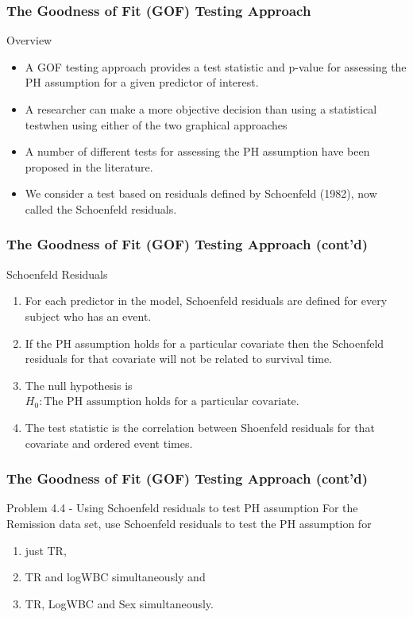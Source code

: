 \documentclass{beamer}
\theoremstyle{definition}
\begin{document}
\begin{frame}
\frametitle{The Goodness of Fit (GOF) Testing Approach}
\begin{block}{Overview}
\begin{itemize}
\item A GOF testing approach provides a test statistic and p-value for
assessing the PH assumption for a given predictor of interest.
\item A researcher can make a more objective decision than using a statistical testwhen using either of
the two graphical approaches
\item A number of different tests for assessing the PH
assumption have been proposed in the literature.
\item We consider a test  based on residuals
defined by Schoenfeld (1982), now called the Schoenfeld
residuals.
\end{itemize}
\end{block}
\end{frame}

\begin{frame}
\frametitle{The Goodness of Fit (GOF) Testing Approach (cont'd)}
\begin{block}{Schoenfeld Residuals}
\begin{enumerate}
\item For each predictor in the model, Schoenfeld
residuals are defined for every subject who
has an event.
\item If the PH assumption holds for a particular covariate
then the Schoenfeld residuals for that
covariate will not be related to survival time.
\item The null hypothesis is $H_0: \text{The PH assumption holds for a particular covariate}$.
\item The test statistic is the correlation between Shoenfeld residuals for that covariate and ordered event times.
\end{enumerate}
\end{block}
\end{frame}

\begin{frame}
\frametitle{The Goodness of Fit (GOF) Testing Approach (cont'd)}
\begin{block}{Problem 4.4 - Using Schoenfeld residuals to test PH assumption}
For the Remission data set, use Schoenfeld residuals to test the PH assumption for
\begin{enumerate}
\item just TR,
\item TR and logWBC simultaneously and
\item TR, LogWBC and Sex simultaneously.
\end{enumerate}
\end{block}
\end{frame}
\end{document}
